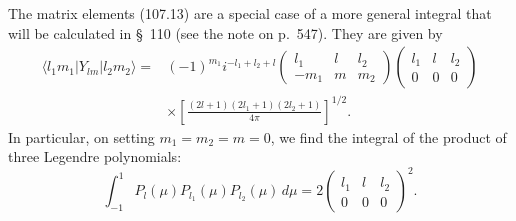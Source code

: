 The matrix elements (107.13) are a special case of a more general integral that will be calculated in \S~110 (see the note on p.~547). They are given by
\begin{equation}
 \begin{aligned}
 \langle l_1m_1|Y_{lm}|l_2m_2\rangle={}&(-1)^{m_1}i^{-l_1+l_2+l}
 \begin{pmatrix}l_1&l&l_2\\-m_1&m&m_2\end{pmatrix}
 \begin{pmatrix}l_1&l&l_2\\0&0&0\end{pmatrix}\\
 &\times\left[\frac{(2l+1)(2l_1+1)(2l_2+1)}{4\pi}\right]^{1/2}.
 \end{aligned}
 \tag{107.14}
\end{equation}
In particular, on setting $m_1=m_2=m=0$, we find the integral of the product of three Legendre polynomials:
\begin{equation}
 \int_{-1}^{1}P_l(\mu)P_{l_1}(\mu)P_{l_2}(\mu)\,d\mu=
 2\begin{pmatrix}l_1&l&l_2\\0&0&0\end{pmatrix}^{2}.
 \tag{107.15}
\end{equation}
